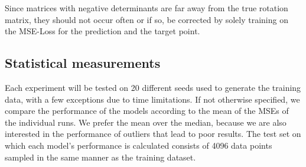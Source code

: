 Since matrices with negative determinants are far away from the true rotation matrix, they should not occur often or if so, be corrected by solely training on the MSE-Loss for the prediction and the target point. 

\subsection{Statistical measurements}
Each experiment will be tested on 20 different seeds used to generate the training data, with a few exceptions due to time limitations. If not otherwise specified, we compare the performance of the models according to the mean of the MSEs of the individual runs. We prefer the mean over the median, because we are also interested in the performance of outliers that lead to poor results. The test set on which each model's performance is calculated consists of 4096 data points sampled in the same manner as the training dataset.\\








\clearpage

